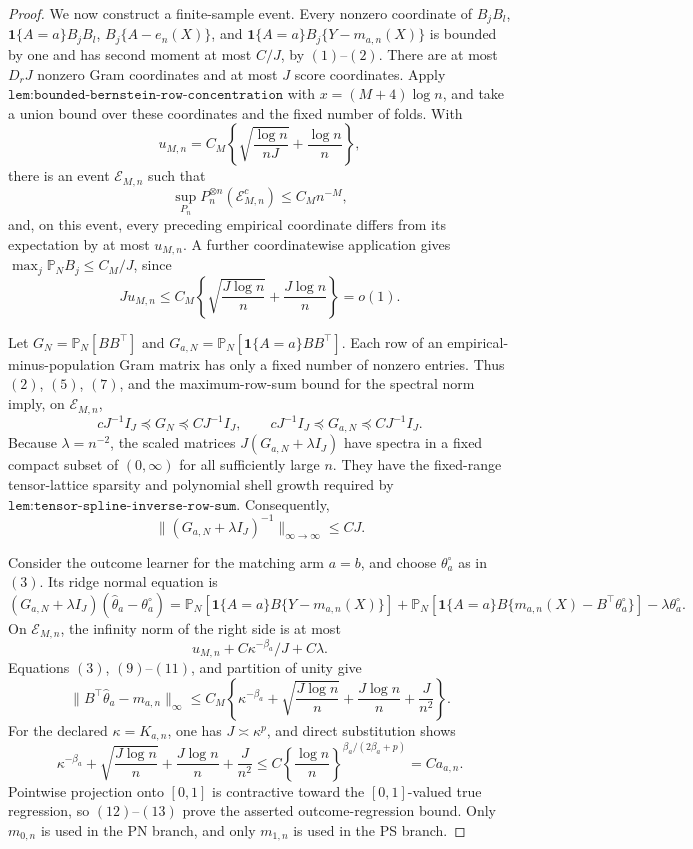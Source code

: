 \documentclass{article}
\begin{document}
\begin{proof}
We now construct a finite-sample event. Every nonzero coordinate of \(B_jB_l\), \(\mathbf1\{A=a\}B_jB_l\), \(B_j\{A-e_n(X)\}\), and \(\mathbf1\{A=a\}B_j\{Y-m_{a,n}(X)\}\) is bounded by one and has second moment at most \(C/J\), by \((1)\)--\((2)\). There are at most \(D_rJ\) nonzero Gram coordinates and at most \(J\) score coordinates. Apply \(\texttt{lem:bounded-bernstein-row-concentration}\) with \(x=(M+4)\log n\), and take a union bound over these coordinates and the fixed number of folds. With
\[u_{M,n}=C_M\left\{\sqrt{\frac{\log n}{nJ}}+\frac{\log n}{n}\right\},\tag{5}\]
there is an event \(\mathcal E_{M,n}\) such that
\[\sup_{P_n}P_n^{\otimes n}(\mathcal E_{M,n}^c)\le C_Mn^{-M},\tag{6}\]
and, on this event, every preceding empirical coordinate differs from its expectation by at most \(u_{M,n}\). A further coordinatewise application gives \(\max_j\mathbb P_NB_j\le C_M/J\), since
\[Ju_{M,n}\le C_M\left\{\sqrt{\frac{J\log n}{n}}+\frac{J\log n}{n}\right\}=o(1).\tag{7}\]

Let \(G_N=\mathbb P_N[BB^\top]\) and \(G_{a,N}=\mathbb P_N[\mathbf1\{A=a\}BB^\top]\). Each row of an empirical-minus-population Gram matrix has only a fixed number of nonzero entries. Thus \((2)\), \((5)\), \((7)\), and the maximum-row-sum bound for the spectral norm imply, on \(\mathcal E_{M,n}\),
\[cJ^{-1}I_J\preceq G_N\preceq CJ^{-1}I_J,\qquad cJ^{-1}I_J\preceq G_{a,N}\preceq CJ^{-1}I_J.\tag{8}\]
Because \(\lambda=n^{-2}\), the scaled matrices \(J(G_{a,N}+\lambda I_J)\) have spectra in a fixed compact subset of \((0,\infty)\) for all sufficiently large \(n\). They have the fixed-range tensor-lattice sparsity and polynomial shell growth required by \(\texttt{lem:tensor-spline-inverse-row-sum}\). Consequently,
\[\lVert(G_{a,N}+\lambda I_J)^{-1}\rVert_{\infty\to\infty}\le CJ.\tag{9}\]

Consider the outcome learner for the matching arm \(a=b\), and choose \(\theta_a^\circ\) as in \((3)\). Its ridge normal equation is
\[(G_{a,N}+\lambda I_J)(\widehat\theta_a-\theta_a^\circ)=\mathbb P_N[\mathbf1\{A=a\}B\{Y-m_{a,n}(X)\}]+\mathbb P_N[\mathbf1\{A=a\}B\{m_{a,n}(X)-B^\top\theta_a^\circ\}]-\lambda\theta_a^\circ.\tag{10}\]
On \(\mathcal E_{M,n}\), the infinity norm of the right side is at most
\[u_{M,n}+C\kappa^{-\beta_a}/J+C\lambda.\tag{11}\]
Equations \((3)\), \((9)\)--\((11)\), and partition of unity give
\[\lVert B^\top\widehat\theta_a-m_{a,n}\rVert_\infty\le C_M\left\{\kappa^{-\beta_a}+\sqrt{\frac{J\log n}{n}}+\frac{J\log n}{n}+\frac{J}{n^2}\right\}.\tag{12}\]
For the declared \(\kappa=K_{a,n}\), one has \(J\asymp\kappa^p\), and direct substitution shows
\[\kappa^{-\beta_a}+\sqrt{\frac{J\log n}{n}}+\frac{J\log n}{n}+\frac{J}{n^2}\le C\left\{\frac{\log n}{n}\right\}^{\beta_a/(2\beta_a+p)}=Ca_{a,n}.\tag{13}\]
Pointwise projection onto \([0,1]\) is contractive toward the \([0,1]\)-valued true regression, so \((12)\)--\((13)\) prove the asserted outcome-regression bound. Only \(m_{0,n}\) is used in the PN branch, and only \(m_{1,n}\) is used in the PS branch.


\end{proof}
\end{document}
